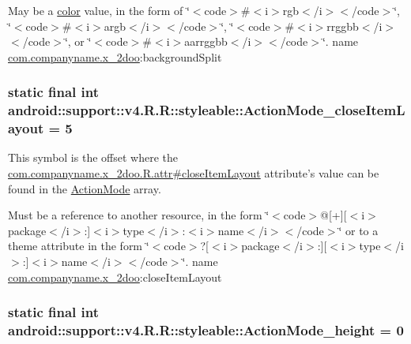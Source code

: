 May be a \hyperlink{classandroid_1_1support_1_1v4_1_1_r_1_1color}{color} value, in the form of \char`\"{}$<$code$>$\#$<$i$>$rgb$<$/i$>$$<$/code$>$\char`\"{}, \char`\"{}$<$code$>$\#$<$i$>$argb$<$/i$>$$<$/code$>$\char`\"{}, \char`\"{}$<$code$>$\#$<$i$>$rrggbb$<$/i$>$$<$/code$>$\char`\"{}, or \char`\"{}$<$code$>$\#$<$i$>$aarrggbb$<$/i$>$$<$/code$>$\char`\"{}.  name \hyperlink{namespacecom_1_1companyname_1_1x__2doo}{com.companyname.x\_\-2doo}:backgroundSplit \hypertarget{classandroid_1_1support_1_1v4_1_1_r_1_1styleable_a4f076d47f79c0b695b050ccd1d9089e}{
\subsubsection[{ActionMode\_\-closeItemLayout}]{\setlength{\rightskip}{0pt plus 5cm}static final int android::support::v4.R.R::styleable::ActionMode\_\-closeItemLayout = 5}}
\label{classandroid_1_1support_1_1v4_1_1_r_1_1styleable_a4f076d47f79c0b695b050ccd1d9089e}


This symbol is the offset where the \hyperlink{classcom_1_1companyname_1_1x__2doo_1_1_r_1_1attr_19f2a0748ec8054e0227d67648e5bb64}{com.companyname.x\_\-2doo.R.attr\#closeItemLayout} attribute's value can be found in the \hyperlink{classandroid_1_1support_1_1v4_1_1_r_1_1styleable_cb0fd98eb07ef010055f95821e8da84e}{ActionMode} array.

Must be a reference to another resource, in the form \char`\"{}$<$code$>$@\mbox{[}+\mbox{]}\mbox{[}$<$i$>$package$<$/i$>$:\mbox{]}$<$i$>$type$<$/i$>$:$<$i$>$name$<$/i$>$$<$/code$>$\char`\"{} or to a theme attribute in the form \char`\"{}$<$code$>$?\mbox{[}$<$i$>$package$<$/i$>$:\mbox{]}\mbox{[}$<$i$>$type$<$/i$>$:\mbox{]}$<$i$>$name$<$/i$>$$<$/code$>$\char`\"{}.  name \hyperlink{namespacecom_1_1companyname_1_1x__2doo}{com.companyname.x\_\-2doo}:closeItemLayout \hypertarget{classandroid_1_1support_1_1v4_1_1_r_1_1styleable_bc09ebbb71fe7090cc37b98f82c34647}{
\subsubsection[{ActionMode\_\-height}]{\setlength{\rightskip}{0pt plus 5cm}static final int android::support::v4.R.R::styleable::ActionMode\_\-height = 0}}
\label{classandroid_1_1support_1_1v4_1_1_r_1_1styleable_bc09ebbb71fe7090cc37b98f82c34647}


